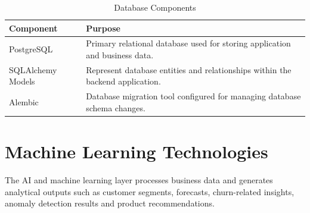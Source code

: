 \documentclass[12pt,a4paper]{report}
\begin{document}
\begin{table}[H]
\centering

\caption{Database Components}

\begin{tabular}{p{4cm} p{9cm}}

\toprule

\textbf{Component} &
\textbf{Purpose}

\\

\midrule

PostgreSQL &
Primary relational database used for storing application and business
data.

\\[6pt]

SQLAlchemy Models &
Represent database entities and relationships within the backend
application.

\\[6pt]

Alembic &
Database migration tool configured for managing database schema changes.

\\

\bottomrule

\end{tabular}

\end{table}



\section{Machine Learning Technologies}

The AI and machine learning layer processes business data and generates
analytical outputs such as customer segments, forecasts, churn-related
insights, anomaly detection results and product recommendations.
\end{document}

